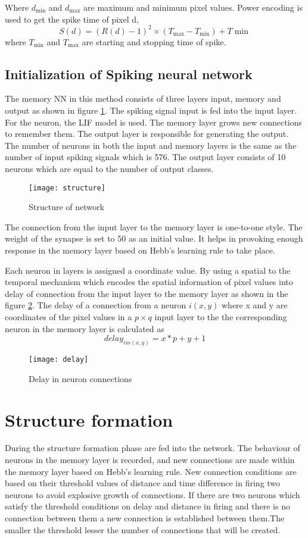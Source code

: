 Where $d_{\min}$ and $d_{\max}$ are maximum and minimum pixel values. Power
encoding is used to get the spike time of pixel d,
\begin{equation*}
    S(d)={(R(d)-1)}^2 \times (T_{\max}-T_{\min})+T{\min}
\end{equation*}
where $T_{\min}$ and $T_{\max}$ are starting and stopping time of spike.
\subsection{Initialization of Spiking neural network}
The memory NN in this method consists of three layers input, memory and output
as shown in figure \ref{structure}. The spiking signal input is fed into the
input layer. For the neuron, the LIF model is used. The memory layer grows new
connections to remember them. The output layer is responsible for generating
the output. The number of neurons in both the input and memory layers is the
same as the number of input spiking signals which is 576. The output layer
consists of 10 neurons which are equal to the number of output classes.
\begin{figure}[h!]
    \centering
    \texttt{[image: structure]}
    \caption{Structure of network}\label{structure}
\end{figure}

The connection from the input layer to the memory layer is one-to-one style.
The weight of the synapse is set to 50 as an initial value. It helps in
provoking enough response in the memory layer based on Hebb's learning
rule\cite{hebbs} to take place.

Each neuron in layers is assigned a coordinate value. By using a spatial to the
temporal mechanism which encodes the spatial information of pixel values into
delay of connection from the input layer to the memory layer as shown in the
figure \ref{delay}. The delay of a connection from a neuron $i(x,y)$ where x
and y are coordinates of the pixel values in a $p \times q$ input layer to the
the corresponding neuron in the memory layer is calculated as
\begin{equation*}
    delay_{im(x,y)}=x*p+y+1
\end{equation*}
\begin{figure}[h!]
    \centering
    \texttt{[image: delay]}
    \caption{Delay in neuron connections}\label{delay}
\end{figure}
\section{Structure formation}
During the structure formation phase are fed into the network. The behaviour of
neurons in the memory layer is recorded, and new connections are made within
the memory layer based on Hebb's learning rule\cite{hebbs}. New connection
conditions are based on their threshold values of distance and time difference
in firing two neurons to avoid explosive growth of connections. If there are
two neurons which satisfy the threshold conditions on delay and distance in
firing and there is no connection between them a new connection is established
between them.The smaller the threshold lesser the number of connections that
will be created.

